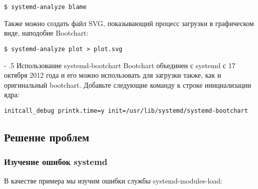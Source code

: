 \documentclass[a4paper,10pt,twoside]{article}
\makeatletter
\renewcommand\paragraph{%
   \@startsection{paragraph}{4}{0mm}%
      {-\baselineskip}%
      {.5\baselineskip}%
      {\normalfont\normalsize\bfseries}}
\makeatother
\begin{document}
\begin{verbatim}
$ systemd-analyze blame
\end{verbatim} 
Также можно создать файл SVG, показывающий процесс загрузки в графическом виде, наподобие Bootchart:

\begin{verbatim}
$ systemd-analyze plot > plot.svg
\end{verbatim} 

\paragraph{Использование systemd-bootchart}
Bootchart объединен с systemd с 17 октября 2012 года и его можно использовать для загрузки также, как и оригинальный bootchart. Добавьте следующие команду к строке инициализации ядра:

\begin{verbatim}
initcall_debug printk.time=y init=/usr/lib/systemd/systemd-bootchart
\end{verbatim} 

\subsection{Решение проблем}
\subsubsection{Изучение ошибок systemd}
В качестве примера мы изучим ошибки службы systemd-modules-load:
\end{document}
